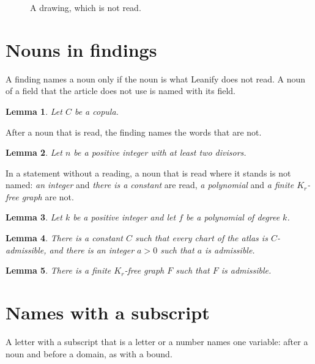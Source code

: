 \documentclass{article}
\newtheorem{lemma}{Lemma}
\begin{document}
\begin{figure}
\caption{A drawing, which is not read.}
\end{figure}

\section{Nouns in findings}

A finding names a noun only if the noun is what Leanify does not read. A noun of a field
that the article does not use is named with its field.

\begin{lemma}\label{noun-of-a-field}
Let $C$ be a copula.
\end{lemma}

After a noun that is read, the finding names the words that are not.

\begin{lemma}\label{words-after-a-noun}
Let $n$ be a positive integer with at least two divisors.
\end{lemma}

In a statement without a reading, a noun that is read where it stands is not named:
\emph{an integer} and \emph{there is a constant} are read, \emph{a polynomial} and
\emph{a finite $K_r$-free graph} are not.

\begin{lemma}\label{unknown-noun}
Let $k$ be a positive integer and let $f$ be a polynomial of degree $k$.
\end{lemma}

\begin{lemma}\label{known-nouns}
There is a constant $C$ such that every chart of the atlas is $C$-admissible, and
there is an integer $a>0$ such that $a$ is admissible.
\end{lemma}

\begin{lemma}\label{noun-with-a-formula}
There is a finite $K_r$-free graph $F$ such that $F$ is admissible.
\end{lemma}

\section{Names with a subscript}

A letter with a subscript that is a letter or a number names one variable: after a noun
and before a domain, as with a bound.
\end{document}
